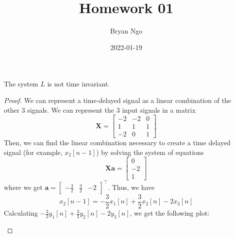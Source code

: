 \documentclass{article}
\title{Homework 01}
\author{Bryan Ngo}
\date{2022-01-19}
\begin{document}
\maketitle

\setcounter{section}{1}

\section{}

\subsection{}

\begin{theorem}
    The system \(L\) is not time invariant.
\end{theorem}
\begin{proof}
    We can represent a time-delayed signal as a linear combination of the other 3 signals.
    We can represent the 3 input signals in a matrix
    \begin{equation}
        \bm{X} =
        \begin{bmatrix}
           -2 & -2 & 0 \\
           1 & 1 & 1 \\
           -2 & 0 & 1 
        \end{bmatrix}
    \end{equation}
    Then, we can find the linear combination necessary to create a time delayed signal (for example, \(x_2[n - 1]\)) by solving the system of equations
    \begin{equation}
        \bm{Xa} =
        \begin{bmatrix}
            0 \\
            -2 \\
            1
        \end{bmatrix}
    \end{equation}
    where we get \(\bm{a} = \begin{bmatrix}
        -\frac{3}{2} & \frac{3}{2} & -2
    \end{bmatrix}^\top\).
    Thus, we have
    \begin{equation}
        x_2[n - 1] = -\frac{3}{2} x_1[n] + \frac{3}{2} x_2[n] - 2x_3[n]
    \end{equation}
    Calculating \(-\frac{3}{2} y_1[n] + \frac{3}{2} y_2[n] - 2y_3[n]\),
    we get the following plot:
    \begin{center}
        \begin{tikzpicture}

\end{tikzpicture}
\end{center}
\end{proof}
\end{document}
